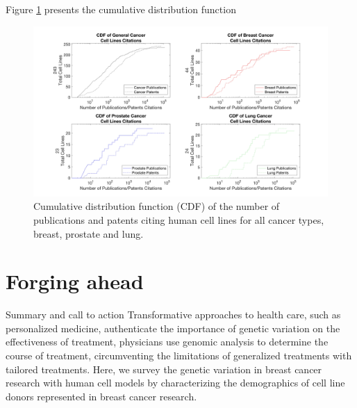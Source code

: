 \documentclass[11pt]{article}
\begin{document}
Figure \ref{CDF} presents the cumulative distribution function 

\begin{figure}[h!]
\centering
\includegraphics[width=1\columnwidth, trim={20cm 20 60 20}, clip]{CDF.jpg}
\caption{\label{CDF} Cumulative distribution function (CDF) of the number of publications and patents citing human cell lines for all cancer types, breast, prostate and lung. }
\end{figure}




\section{Forging ahead}

Summary and call to action
Transformative approaches to health care, such as personalized medicine, authenticate the importance of genetic variation on the effectiveness of treatment, physicians use genomic analysis to determine the course of treatment, circumventing the limitations of generalized treatments with tailored treatments. Here, we survey the genetic variation in breast cancer research with human cell models by characterizing the demographics of cell line donors represented in breast cancer research. 






\end{document}
